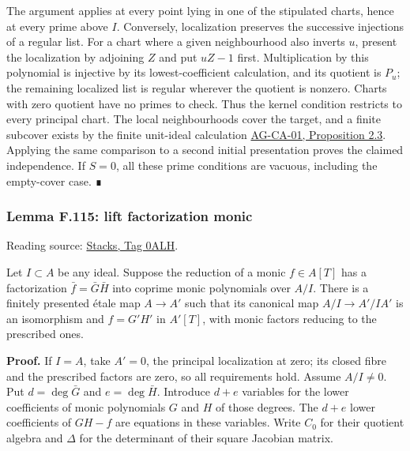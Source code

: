 \documentclass[11pt,a4paper,openany]{report}
\begin{document}
The argument applies at every point lying in one of the stipulated charts, hence at every prime above \(I\). Conversely, localization preserves the successive injections of a regular list. For a chart where a given neighbourhood also inverts \(u\), present the localization by adjoining \(Z\) and put \(uZ-1\) first. Multiplication by this polynomial is injective by its lowest-coefficient calculation, and its quotient is \(P_u\); the remaining localized list is regular wherever the quotient is nonzero. Charts with zero quotient have no primes to check. Thus the kernel condition restricts to every principal chart. The local neighbourhoods cover the target, and a finite subcover exists by the finite unit-ideal calculation \href{https://github.com/KokunoYumeto/open-math-courses/blob/d02d0a3669f42579db037cd44de1d113fdd770a1/docs/courses/AG-CA/src/spectra-of-rings.md}{AG-CA-01, Proposition 2.3}. Applying the same comparison to a second initial presentation proves the claimed independence. If \(S=0\), all these prime conditions are vacuous, including the empty-cover case. ∎

\label{AG-RG-S05-more-algebra-lemma-lift-factorization-monic}

\subsubsection{Lemma F.115: lift factorization monic}\label{AG-RG-S05-lemma-f.115-lift-factorization-monic}

Reading source: \href{https://stacks.math.columbia.edu/tag/0ALH}{Stacks, Tag 0ALH}.

Let \(I\subset A\) be any ideal. Suppose the reduction of a monic \(f\in A[T]\) has a factorization \(\bar f=\bar G\bar H\) into coprime monic polynomials over \(A/I\). There is a finitely presented étale map \(A\to A'\) such that its canonical map \(A/I\to A'/IA'\) is an isomorphism and \(f=G'H'\) in \(A'[T]\), with monic factors reducing to the prescribed ones.

\textbf{Proof.} If \(I=A\), take \(A'=0\), the principal localization at zero; its closed fibre and the prescribed factors are zero, so all requirements hold. Assume \(A/I\ne0\). Put \(d=\deg\bar G\) and \(e=\deg\bar H\). Introduce \(d+e\) variables for the lower coefficients of monic polynomials \(G\) and \(H\) of those degrees. The \(d+e\) lower coefficients of \(GH-f\) are equations in these variables. Write \(C_0\) for their quotient algebra and \(\Delta\) for the determinant of their square Jacobian matrix.
\end{document}
